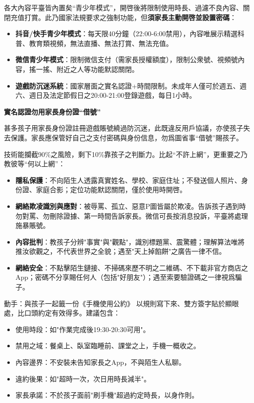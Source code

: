 
各大內容平臺皆內置矣“青少年模式”，開啓後將限制使用時長、過濾不良內容、關閉充值打賞。此乃國家法規要求之強制功能，但\textbf{須家長主動開啓並設置密碼}：

\begin{itemize}
  \item \textbf{抖音/快手青少年模式}：每天限40分鐘（22:00-6:00禁用），內容唯展示精選科普、教育類視頻，無法直播、無法打賞、無法充值。
  \item \textbf{微信青少年模式}：限制微信支付（需家長授權額度），限制公衆號、視頻號內容，搖一搖、附近之人等功能默認關閉。
  \item \textbf{遊戲防沉迷系統}：國家層面之實名認證+時間限制。未成年人僅可於週五、週六、週日及法定節假日之20:00-21:00登錄遊戲，每日1小時。
\end{itemize}

\textbf{實名認證勿用家長身份證“借號”}\par

甚多孩子用家長身份證註冊遊戲賬號繞過防沉迷，此既違反用戶協議，亦使孩子失去保護。家長應保管好自己之支付密碼與身份信息，勿爲圖省事“借號”賜孩子。


技術能攔截90\%之風險，剩下10\%靠孩子之判斷力。比起“不許上網”，更重要之乃教彼等“何以上網”：

\begin{itemize}
  \item \textbf{隱私保護}：不向陌生人透露真實姓名、學校、家庭住址；不發送個人照片、身份證、家庭合影；定位功能默認關閉，僅於使用時開啓。
  \item \textbf{網絡欺凌識別與應對}：被辱罵、孤立、惡意P圖皆屬於欺凌。告訴孩子遇到時勿對罵、勿刪除證據、第一時間告訴家長。微信可長按消息投訴，平臺將處理施暴賬號。
  \item \textbf{內容批判}：教孩子分辨"事實"與"觀點"，識別標題黨、震驚體；理解算法唯將推汝欲觀之，不代表世界之全貌；遇至"天上掉餡餅"之廣告一律不信。
  \item \textbf{網絡安全}：不點擊陌生鏈接、不掃碼來歷不明之二維碼、不下載非官方商店之App；密碼不分享賜任何人（包括"好朋友"）；遇至索要驗證碼之一律視爲騙子。
\end{itemize}

\begin{tcbpractice}{動手：與孩子一起籤一份《手機使用公約》}
以規則寫下來、雙方簽字貼於顯眼處，比口頭約定有效得多。建議包含：

\begin{itemize}
  \item 使用時段：如"作業完成後19:30-20:30可用"。
  \item 禁用之域：餐桌上、臥室臨睡前、課堂之上，手機一概收之。
  \item 內容邊界：不安裝未告知家長之App，不與陌生人私聊。
  \item 違約後果：如"超時一次，次日用時長減半"。
  \item 家長承諾：不於孩子面前"刷手機"超過約定時長，以身作則。
\end{itemize}

\end{tcbpractice}

